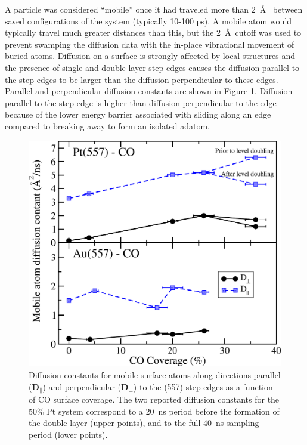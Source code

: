 \documentclass[journal = jpccck, manuscript = article]{achemso}
\begin{document}
A particle was considered ``mobile'' once it had traveled more than
2~\AA~ between saved configurations of the system (typically 10-100
ps). A mobile atom would typically travel much greater distances than
this, but the 2~\AA~cutoff was used to prevent swamping the diffusion
data with the in-place vibrational movement of buried atoms. Diffusion
on a surface is strongly affected by local structures and the presence
of single and double layer step-edges causes the diffusion parallel to
the step-edges to be larger than the diffusion perpendicular to these
edges. Parallel and perpendicular diffusion constants are shown in
Figure \ref{fig:diff}.  Diffusion parallel to the step-edge is higher
than diffusion perpendicular to the edge because of the lower energy
barrier associated with sliding along an edge compared to breaking
away to form an isolated adatom.

\begin{figure}[H]
\includegraphics[width=\linewidth]{Portrait_DiffusionComparison_1}
\caption{Diffusion constants for mobile surface atoms along directions
  parallel ($\mathbf{D}_{\parallel}$) and perpendicular
  ($\mathbf{D}_{\perp}$) to the (557) step-edges as a function of CO
  surface coverage.  The two reported diffusion constants for the 50\%
  Pt system correspond to a 20~ns period before the formation of the
  double layer (upper points), and to the full 40~ns sampling period
  (lower points).}
\label{fig:diff}
\end{figure}
\end{document}
